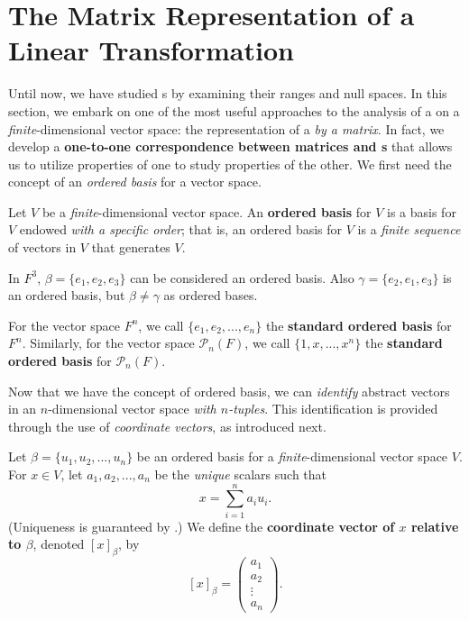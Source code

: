 \section{The Matrix Representation of a Linear Transformation} \label{sec 2.2}

Until now, we have studied \LTRAN{}s by examining their ranges and null spaces.
In this section, we embark on one of the most useful approaches to the analysis of a \LTRAN{} on a \emph{finite}-dimensional vector space:
the representation of a \LTRAN{} \emph{by a matrix}.
In fact, we develop a \textbf{one-to-one correspondence between matrices and \LTRAN{}s} that allows us to utilize properties of one to study properties of the other.
We first need the concept of an \emph{ordered basis} for a vector space.

\begin{definition} \label{def 2.4}
Let \(V\) be a \emph{finite}-dimensional vector space.
An \textbf{ordered basis} for \(V\) is a basis for \(V\) endowed \emph{with a specific order};
that is, an ordered basis for \(V\) is a \emph{finite sequence} of \LID{} vectors in \(V\) that generates \(V\).
\end{definition}

\begin{example} \label{example 2.2.1}
In \(F^3\), \(\beta = \{ e_1, e_2, e_3 \}\) can be considered an ordered basis.
Also \(\gamma = \{ e_2, e_1, e_3 \}\) is an ordered basis, but \(\beta \ne \gamma\) as ordered bases.
\end{example}

\begin{additional definition} \label{adef 2.4}
For the vector space \(F^n\), we call \(\{ e_1, e_2, ..., e_n \}\) the \textbf{standard ordered basis} for \(F^n\).
Similarly, for the vector space \(\mathcal{P}_n(F)\), we call \(\{ 1, x, ..., x^n \}\) the \textbf{standard ordered basis} for \(\mathcal{P}_n(F)\).
\end{additional definition}

\begin{remark} \label{remark 2.2.1}
Now that we have the concept of ordered basis, we can \emph{identify} abstract vectors in an \(n\)-dimensional vector space \emph{with \(n\)-tuples}.
This identification is provided through the use of \emph{coordinate vectors}, as introduced next.
\end{remark}

\begin{definition} \label{def 2.5}
Let \(\beta = \{ u_1, u_2, ..., u_n \}\) be an ordered basis for a \emph{finite}-dimensional vector space \(V\).
For \(x \in V\), let \(a_1, a_2, ..., a_n\) be the \emph{unique} scalars such that
\[
    x = \sum_{i = 1}^n a_i u_i.
\]
(Uniqueness is guaranteed by .)
We define the \textbf{coordinate vector of \(x\) relative to \(\beta\)}, denoted \([x]_{\beta}\), by
\[
    [x]_{\beta} = \begin{pmatrix} a_1 \\ a_2 \\ \vdots \\ a_n \end{pmatrix}.
\]
\end{definition}

